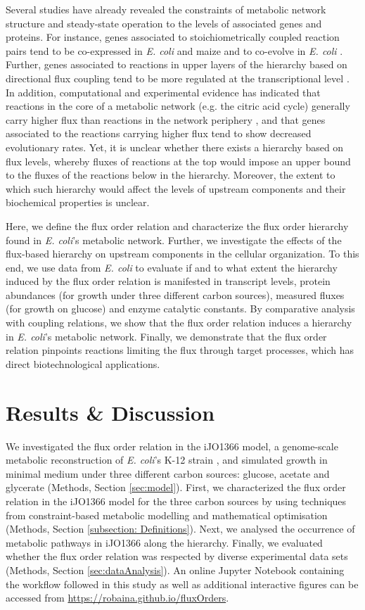 \documentclass[12pt]{article}
\begin{document}
Several studies have already revealed the constraints of metabolic network structure and steady-state operation to the levels of associated genes and proteins.  For instance, genes associated to stoichiometrically coupled reaction pairs tend to be co-expressed in \emph{E. coli}\cite{Notebaart2008} and maize \cite{Robaina-Estevez2016} and to co-evolve in \emph{E. coli} \cite{Pal2005}. Further, genes associated to reactions in upper layers of the hierarchy based on directional flux coupling tend to be more regulated at the transcriptional level \cite{Hosseini2015}. In addition, computational and experimental evidence has indicated that reactions in the core of a metabolic network (e.g. the citric acid cycle) generally carry higher flux than reactions in the network periphery \cite{Almaas2004, Vitkup2006a}, and that genes associated to the reactions carrying higher flux tend to show decreased evolutionary rates\cite{Vitkup2006a}. Yet, it is unclear whether there exists a hierarchy based on flux levels, whereby fluxes of reactions at the top would impose an upper bound to the fluxes of the reactions below in the hierarchy. Moreover, the extent to which such hierarchy would affect the levels of upstream components and their biochemical properties is unclear.

Here, we define the flux order relation and characterize the flux order hierarchy found in \emph{E. coli}'s metabolic network. Further, we investigate the effects of the flux-based hierarchy on upstream components in the cellular organization. To this end, we use data from \emph{E. coli} to evaluate if and to what extent the hierarchy induced by the flux order relation is manifested in transcript levels, protein abundances (for growth under three different carbon sources), measured fluxes (for growth on glucose) and enzyme catalytic constants. By comparative analysis with coupling relations, we show that the flux order relation induces a hierarchy in \emph{E. coli}'s metabolic network.  Finally, we demonstrate that the flux order relation pinpoints reactions limiting the flux through target processes, which has direct biotechnological applications.

\section{Results \& Discussion}
We investigated the flux order relation in the iJO1366 model, a genome-scale metabolic reconstruction of \emph{E. coli}'s K-12 strain \cite{Orth2014}, and simulated growth in minimal medium under three different carbon sources: glucose, acetate and glycerate (Methods, Section \ref{sec:model}). First, we characterized the flux order relation in the iJO1366 model for the three carbon sources by using techniques from constraint-based metabolic modelling and mathematical optimisation (Methods, Section \ref{subsection: Definitions}). Next, we analysed the occurrence of metabolic pathways in iJO1366 along the hierarchy. Finally, we evaluated whether the flux order relation was respected by diverse experimental data sets (Methods, Section \ref{sec:dataAnalysis}). An online Jupyter Notebook containing the workflow followed in this study as well as additional interactive figures can be accessed from \url{https://robaina.github.io/fluxOrders}.
\end{document}
